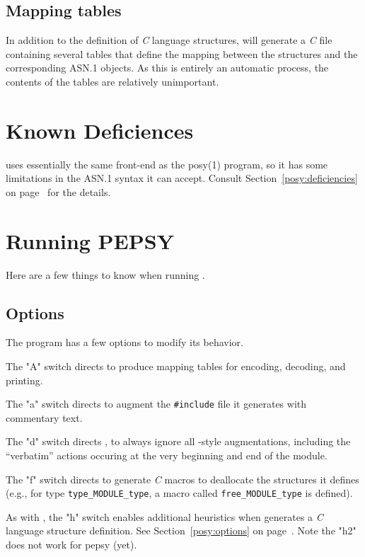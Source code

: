 \subsection	{Mapping tables}
In addition to the definition of {\em C\/} language structures,
 will generate a {\em C\/} file containing several tables that
define the mapping between the structures and the corresponding ASN.1 objects.
As this is entirely an automatic process,
the contents of the tables are relatively unimportant.

\section	{Known Deficiences}
 uses essentially the same front-end as the \man posy(1) program,
so it has some limitations in the ASN.1 syntax it can accept.
Consult Section~\ref{posy:deficiencies} on page~\pageref{posy:deficiencies}
for the details.

\section	{Running PEPSY}
Here are a few things to know when running .

\subsection	{Options}
The  program has a few options to modify its behavior.

The \switch"A" switch directs  to produce mapping tables for
encoding, decoding, and printing.

The \switch"a" switch directs  to augment the \verb"#include" file
it generates with commentary text.

The \switch"d" switch directs ,
to always ignore all -style augmentations,
including the 
``verbatim'' actions occuring at the very beginning and end of the module.

The \switch"f" switch directs  to generate {\em C\/} macros to
deallocate the structures it defines
(e.g., for type \verb"type_MODULE_type",
a macro called \verb"free_MODULE_type" is defined).

As with ,
the \switch"h" switch enables additional heuristics when  generates
a {\em C\/} language structure definition.
See Section~\ref{posy:options} on page~\pageref{posy:options}.
Note the \switch"h2" does not work for pepsy (yet).


